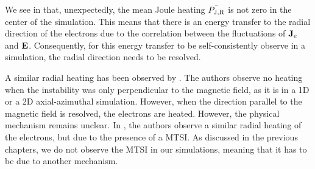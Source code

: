   We see in  that, unexpectedly,  the mean Joule heating $\bar{P_{\rm J, R}}$ is not zero in the center of the simulation.
  This means that there is an energy transfer to the radial direction of the electrons due to the correlation between the fluctuations of ${\mathbf J_e}$ and ${\mathbf E}$.
  Consequently, for this energy transfer to be self-consistently observe in a simulation, the radial direction needs to be resolved.

  A similar radial heating has been observed by \citet{heron2013}.
  The authors observe no heating when the instability was only perpendicular to the magnetic field, as it is in a \ac{1D} or a \ac{2D} axial-azimuthal simulation.
  However, when the direction parallel to the magnetic field is resolved, the electrons are heated.
  However, the physical mechanism remains unclear.
  In \citet{janhunen}, the authors observe a similar radial heating of the electrons, but due to the presence of a \ac{MTSI}.
  As discussed in the previous chapters, we do not observe the \ac{MTSI} in our simulations, meaning that it has to be due to another mechanism.


